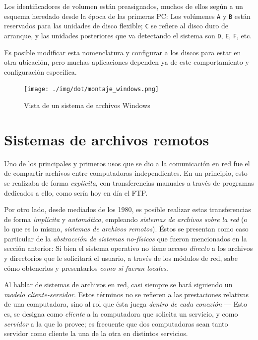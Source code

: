 \documentclass[11pt,fleqn]{book} %
\begin{document}
Los identificadores de volumen están preasignados, muchos de ellos
según a un esquema heredado desde la época de las primeras PC: Los
volúmenes \texttt{A} y \texttt{B} están reservados para las unidades de disco
flexible; \texttt{C} se refiere al disco duro de arranque, y las unidades
posteriores que va detectando el sistema son \texttt{D}, \texttt{E}, \texttt{F}, etc.

Es posible modificar esta nomenclatura y configurar a los discos para
estar en otra ubicación, pero muchas aplicaciones dependen ya de este
comportamiento y configuración específica.

\begin{figure}[htb]
\centering
\texttt{[image: ./img/dot/montaje\_windows.png]}
\caption{\label{DIR_montaje_windows}Vista de un sistema de archivos Windows}
\end{figure}
\section{Sistemas de archivos remotos}
\label{sec-6-4}


Uno de los principales y primeros usos que se dio a la comunicación en
red fue el de compartir archivos entre computadoras independientes. En
un principio, esto se realizaba de forma \emph{explícita}, con
transferencias manuales a través de programas dedicados a ello, como
sería hoy en día el FTP.

Por otro lado, desde mediados de los 1980, es posible realizar estas
transferencias de forma \emph{implícita} y \emph{automática}, empleando
\emph{sistemas de archivos sobre la red} (o lo que es lo mismo, \emph{sistemas de archivos remotos}).  Éstos se presentan como caso particular de
la \emph{abstracción de sistemas no-físicos} que fueron mencionados en la sección
anterior: Si bien el sistema operativo no tiene acceso \emph{directo} a los
archivos y directorios que le solicitará el usuario, a través de los
módulos de red, sabe cómo obtenerlos y presentarlos \emph{como si fueran locales}.

Al hablar de sistemas de archivos en red, casi siempre se hará
siguiendo un \emph{modelo cliente-servidor}. Estos términos no se refieren
a las prestaciones relativas de una computadora, sino al rol que ésta
juega \emph{dentro de cada conexión} — Esto es, se designa como \emph{cliente} a
la computadora que solicita un servicio, y como \emph{servidor} a la que lo
provee; es frecuente que dos computadoras sean tanto servidor como
cliente la una de la otra en distintos servicios.
\end{document}
